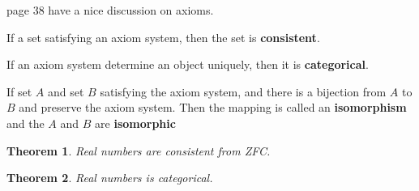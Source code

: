 \documentclass[letter]{article}
\newtheorem{theorem}{Theorem}[section]
\newenvironment{definition}[1][Definition]{\begin{trivlist}
\item[\hskip \labelsep {\bfseries #1}]}{\end{trivlist}}
\begin{document}
page 38 have a nice discussion on axioms.

\begin{definition}
If a set satisfying an axiom system, then the set is \textbf{consistent}.
\end{definition}
\begin{definition}
If an axiom system determine an object uniquely, then it is \textbf{categorical}.
\end{definition}
\begin{definition}
If set $A$ and set $B$ satisfying the axiom system, and there is a bijection from $A$ to $B$ and preserve the axiom system. Then the mapping is called an \textbf{isomorphism} and the $A$ and $B$ are \textbf{isomorphic}
\end{definition}
\begin{theorem}
Real numbers are consistent from ZFC.
\end{theorem}
\begin{theorem}
Real numbers is categorical.
\end{theorem}
\end{document}
